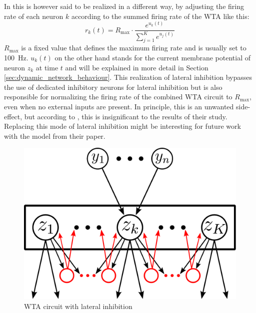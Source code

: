 In \parencite{klampfl_maass_2013} this is however said to be realized in a different way, by adjusting the firing rate of each neuron $k$ according to the summed firing rate of the WTA like this:
\begin{equation}
    r_k(t)=R_{\max}\cdot \frac{e^{u_k(t)}}{\sum_{j=1}^{K} e^{u_j(t)}}
    \label{eqn:firing_rate_paper}
\end{equation}
$R_{\max}$ is a fixed value that defines the maximum firing rate and is usually set to \SI{100}{\hertz}. $u_k(t)$ on the other hand stands for the current membrane potential of neuron $z_k$ at time $t$ and will be explained in more detail in Section \ref{sec:dynamic_network_behaviour}.
This realization of lateral inhibition bypasses the use of dedicated inhibitory neurons for lateral inhibition but is also responsible for normalizing the firing rate of the combined WTA circuit to $R_{\max}$, even when no external inputs are present. In principle, this is an unwanted side-effect, but according to \parencite{klampfl_maass_2013}, this is insignificant to the results of their study. Replacing this mode of lateral inhibition might be interesting for future work with the model from their paper.\\

\begin{figure}[htbp]
  \centering
  \includegraphics[width=0.8\columnwidth]{Figures/wta_circuit.pdf}
  \caption{WTA circuit with lateral inhibition}
  \label{fig:wta_circuit}
\end{figure}

